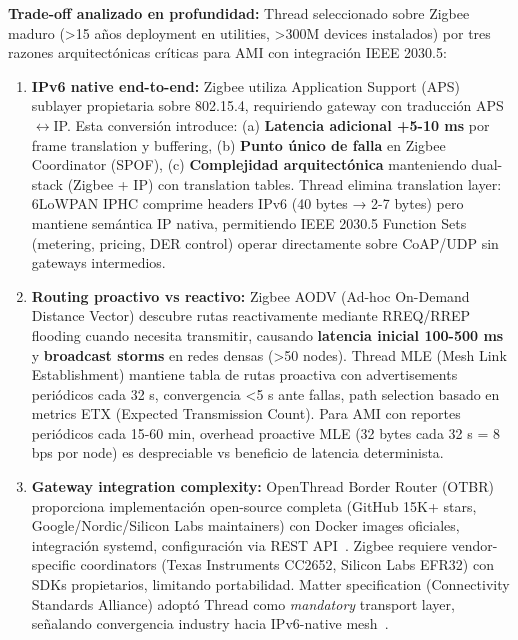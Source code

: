 \textbf{Trade-off analizado en profundidad:} Thread seleccionado sobre Zigbee maduro (>15 años deployment en utilities, >300M devices instalados) por tres razones arquitectónicas críticas para AMI con integración IEEE 2030.5:

\begin{enumerate}
    \item \textbf{IPv6 native end-to-end:} Zigbee utiliza Application Support (APS) sublayer propietaria sobre 802.15.4, requiriendo gateway con traducción APS$\leftrightarrow$IP. Esta conversión introduce: (a) \textbf{Latencia adicional +5-10 ms} por frame translation y buffering, (b) \textbf{Punto único de falla} en Zigbee Coordinator (SPOF), (c) \textbf{Complejidad arquitectónica} manteniendo dual-stack (Zigbee + IP) con translation tables. Thread elimina translation layer: 6LoWPAN IPHC comprime headers IPv6 (40 bytes → 2-7 bytes) pero mantiene semántica IP nativa, permitiendo IEEE 2030.5 Function Sets (metering, pricing, DER control) operar directamente sobre CoAP/UDP sin gateways intermedios.
    
    \item \textbf{Routing proactivo vs reactivo:} Zigbee AODV (Ad-hoc On-Demand Distance Vector) descubre rutas reactivamente mediante RREQ/RREP flooding cuando necesita transmitir, causando \textbf{latencia inicial 100-500 ms} y \textbf{broadcast storms} en redes densas (>50 nodes). Thread MLE (Mesh Link Establishment) mantiene tabla de rutas proactiva con advertisements periódicos cada 32 s, convergencia <5 s ante fallas, path selection basado en metrics ETX (Expected Transmission Count). Para AMI con reportes periódicos cada 15-60 min, overhead proactive MLE (32 bytes cada 32 s = 8 bps por node) es despreciable vs beneficio de latencia determinista.
    
    \item \textbf{Gateway integration complexity:} OpenThread Border Router (OTBR) proporciona implementación open-source completa (GitHub 15K+ stars, Google/Nordic/Silicon Labs maintainers) con Docker images oficiales, integración systemd, configuración via REST API~\cite{openthread2024}. Zigbee requiere vendor-specific coordinators (Texas Instruments CC2652, Silicon Labs EFR32) con SDKs propietarios, limitando portabilidad. Matter specification (Connectivity Standards Alliance) adoptó Thread como \textit{mandatory} transport layer, señalando convergencia industry hacia IPv6-native mesh~\cite{threadMatterConvergence2024}.
\end{enumerate}

